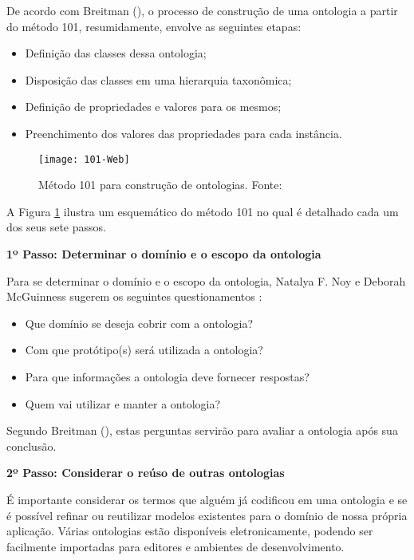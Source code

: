   
  De acordo com Breitman (\citeyear{breitman05}), o processo de construção de uma ontologia a partir do método 101,
  resumidamente, envolve as seguintes etapas:
  \begin{itemize}
   \item Definição das classes dessa ontologia;
   \item Disposição das classes em uma hierarquia taxonômica;
   \item Definição de propriedades e valores para os mesmos;
   \item Preenchimento dos valores das propriedades para cada instância.
  \end{itemize}
  
  \begin{figure}[!htb]
    \centering
    \texttt{[image: 101-Web]}
    \caption[Método 101 para construção de ontologia]{Método 101 para construção de ontologias. Fonte: \cite{bortolato14}}
    \label{fig:101-Web}
  \end{figure}
  
  A Figura \ref{fig:101-Web} ilustra um esquemático do método 101 no qual é detalhado cada um dos seus sete passos.
  
\vspace{0.5cm}  
  
{\raggedright  
  \textbf{1º Passo: Determinar o domínio e o escopo da ontologia}
}
  
  Para se determinar o domínio e o escopo da ontologia, Natalya F. Noy e Deborah McGuinness sugerem os seguintes questionamentos
  \cite{breitman05}:
  
  \begin{itemize}
   \item Que domínio se deseja cobrir com a ontologia?
   \item Com que protótipo(s) será utilizada a ontologia?
   \item Para que informações a ontologia deve fornecer respostas?
   \item Quem vai utilizar e manter a ontologia?
  \end{itemize}
  
  Segundo Breitman (\citeyear{breitman05}), estas perguntas servirão para avaliar a ontologia após sua conclusão.
  
\vspace{0.5cm}  
  
{\raggedright  
  \textbf{2º Passo: Considerar o reúso de outras ontologias}
}
  
  É importante considerar os termos que alguém já codificou em uma ontologia e se é possível refinar ou reutilizar
  modelos existentes para o domínio de nossa própria aplicação. Várias ontologias estão disponíveis eletronicamente,
  podendo ser facilmente importadas para editores e ambientes de desenvolvimento. \cite{breitman05}
  
